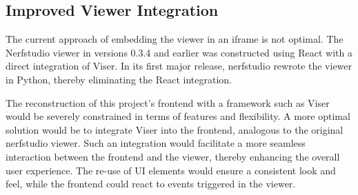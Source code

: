 \subsection*{Improved Viewer Integration}

The current approach of embedding the viewer in an iframe is not optimal.
The Nerfstudio viewer in versions 0.3.4 and earlier was constructed using React with a direct integration of Viser.
In its first major release, nerfstudio rewrote the viewer in Python, thereby eliminating the React integration.

The reconstruction of this project's frontend with a framework such as Viser would be severely constrained in terms of features and flexibility.
A more optimal solution would be to integrate Viser into the frontend, analogous to the original nerfstudio viewer.
Such an integration would facilitate a more seamless interaction between the frontend and the viewer, thereby enhancing the overall user experience.
The re-use of UI elements would ensure a consistent look and feel, while the frontend could react to events triggered in the viewer.
